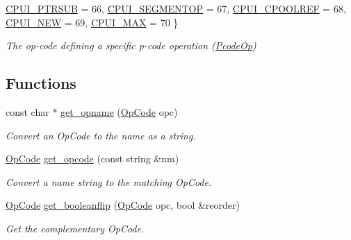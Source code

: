 \begin{DoxyCompactItemize}
\newline
\mbox{\hyperlink{opcodes_8hh_abeb7dfb0e9e2b3114e240a405d046ea7acd169003bfcb2e8dde0cb2dc1f534449}{C\+P\+U\+I\+\_\+\+P\+T\+R\+S\+UB}} = 66, 
\mbox{\hyperlink{opcodes_8hh_abeb7dfb0e9e2b3114e240a405d046ea7ab67fab74923ce6c8be1c2254b9afb4f9}{C\+P\+U\+I\+\_\+\+S\+E\+G\+M\+E\+N\+T\+OP}} = 67, 
\mbox{\hyperlink{opcodes_8hh_abeb7dfb0e9e2b3114e240a405d046ea7a5d4235f59c3d4320bae86e84f0cc9f62}{C\+P\+U\+I\+\_\+\+C\+P\+O\+O\+L\+R\+EF}} = 68, 
\mbox{\hyperlink{opcodes_8hh_abeb7dfb0e9e2b3114e240a405d046ea7a980255c6f8e1cd7c7c7b035554292735}{C\+P\+U\+I\+\_\+\+N\+EW}} = 69, 
\newline
\mbox{\hyperlink{opcodes_8hh_abeb7dfb0e9e2b3114e240a405d046ea7a2541f47ee1b8f18543c5749b49cada91}{C\+P\+U\+I\+\_\+\+M\+AX}} = 70
 \}
\begin{DoxyCompactList}\small\item\em The op-\/code defining a specific p-\/code operation (\mbox{\hyperlink{class_pcode_op}{Pcode\+Op}}) \end{DoxyCompactList}\end{DoxyCompactItemize}
\subsection*{Functions}
\begin{DoxyCompactItemize}
\item 
const char $\ast$ \mbox{\hyperlink{opcodes_8hh_af739d367233d5c761457f782e249ce7a}{get\+\_\+opname}} (\mbox{\hyperlink{opcodes_8hh_abeb7dfb0e9e2b3114e240a405d046ea7}{Op\+Code}} opc)
\begin{DoxyCompactList}\small\item\em Convert an Op\+Code to the name as a string. \end{DoxyCompactList}\item 
\mbox{\hyperlink{opcodes_8hh_abeb7dfb0e9e2b3114e240a405d046ea7}{Op\+Code}} \mbox{\hyperlink{opcodes_8hh_a2cd84b54da8ccadc300e0338206c6a9a}{get\+\_\+opcode}} (const string \&nm)
\begin{DoxyCompactList}\small\item\em Convert a name string to the matching Op\+Code. \end{DoxyCompactList}\item 
\mbox{\hyperlink{opcodes_8hh_abeb7dfb0e9e2b3114e240a405d046ea7}{Op\+Code}} \mbox{\hyperlink{opcodes_8hh_aef6d0ca050c58ba0cc5f3a52c9182fec}{get\+\_\+booleanflip}} (\mbox{\hyperlink{opcodes_8hh_abeb7dfb0e9e2b3114e240a405d046ea7}{Op\+Code}} opc, bool \&reorder)
\begin{DoxyCompactList}\small\item\em Get the complementary Op\+Code. \end{DoxyCompactList}\end{DoxyCompactItemize}


